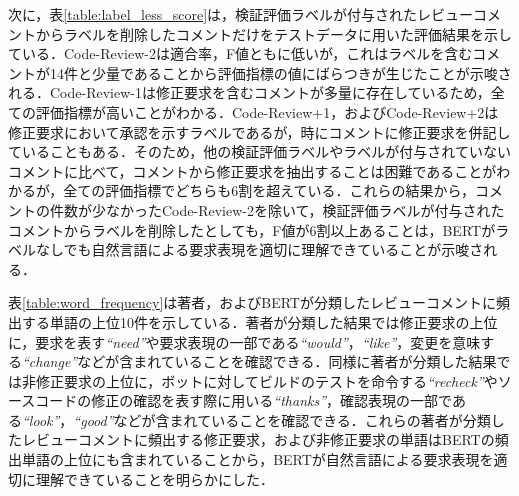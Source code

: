 \documentclass[11pt]{jreport}
\begin{document}
次に，表\ref{table:label_less_score}は，検証評価ラベルが付与されたレビューコメントからラベルを削除したコメントだけをテストデータに用いた評価結果を示している．Code-Review-2は適合率，F値ともに低いが，これはラベルを含むコメントが14件と少量であることから評価指標の値にばらつきが生じたことが示唆される．Code-Review-1は修正要求を含むコメントが多量に存在しているため，全ての評価指標が高いことがわかる．Code-Review+1，およびCode-Review+2は修正要求において承認を示すラベルであるが，時にコメントに修正要求を併記していることもある．そのため，他の検証評価ラベルやラベルが付与されていないコメントに比べて，コメントから修正要求を抽出することは困難であることがわかるが，全ての評価指標でどちらも6割を超えている．これらの結果から，コメントの件数が少なかったCode-Review-2を除いて，検証評価ラベルが付与されたコメントからラベルを削除したとしても，F値が6割以上あることは，BERTがラベルなしでも自然言語による要求表現を適切に理解できていることが示唆される．

\begin{table}[t]
\centering
  \caption{検証評価ラベルを除いたコメントに含まれる修正要求の予測精度}
  \label{table:label_less_score}
\end{table}

表\ref{table:word_frequency}は著者，およびBERTが分類したレビューコメントに頻出する単語の上位10件を示している．著者が分類した結果では修正要求の上位に，要求を表す\textit{``need''}や要求表現の一部である\textit{``would''}，\textit{``like''}，変更を意味する\textit{``change''}などが含まれていることを確認できる．同様に著者が分類した結果では非修正要求の上位に，ボットに対してビルドのテストを命令する\textit{``recheck''}やソースコードの修正の確認を表す際に用いる\textit{``thanks''}，確認表現の一部である\textit{``look''}，\textit{``good''}などが含まれていることを確認できる．これらの著者が分類したレビューコメントに頻出する修正要求，および非修正要求の単語はBERTの頻出単語の上位にも含まれていることから，BERTが自然言語による要求表現を適切に理解できていることを明らかにした．
\end{document}
